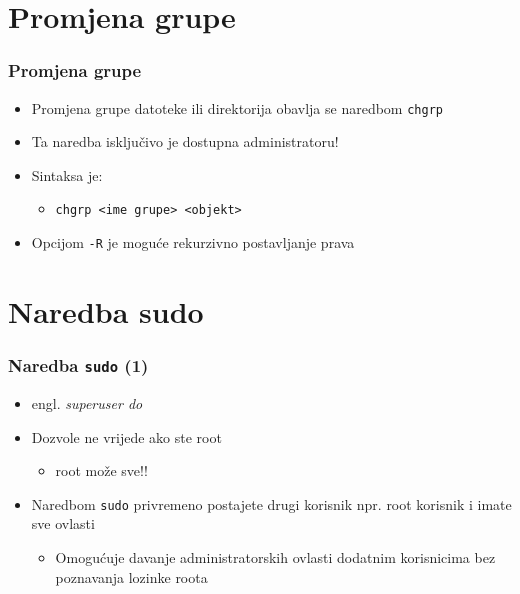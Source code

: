 \documentclass[table,usenames,dvipsnames]{beamer}
\newcommand{\shell}[1]{\texttt{#1}}
\begin{document}
\section{Promjena grupe}
\begin{frame}[t]
\frametitle{Promjena grupe}
\begin{itemize}
  \item Promjena grupe datoteke ili direktorija obavlja se naredbom 
        \shell{chgrp}
  \item Ta naredba isključivo je dostupna administratoru!
  \item Sintaksa je:
  \begin{itemize}
    \item[] \shell{chgrp <ime grupe> <objekt>}
  \end{itemize}
  \item Opcijom \shell{-R} je moguće rekurzivno postavljanje prava 
\end{itemize}
\end{frame}

\section{Naredba sudo}
\begin{frame}[t]
\frametitle{Naredba \shell{sudo} (1)}
\begin{itemize}
  \item engl. \emph{superuser do}
  \item Dozvole ne vrijede ako ste root
  \begin{itemize}
    \item root može sve!!
  \end{itemize}
  \item Naredbom \shell{sudo} privremeno postajete drugi korisnik npr. 
        root korisnik i imate sve ovlasti
  \begin{itemize}
    \item Omogućuje davanje administratorskih ovlasti dodatnim korisnicima
          bez poznavanja lozinke roota
  \end{itemize}
\end{itemize}
\end{frame}
\end{document}
